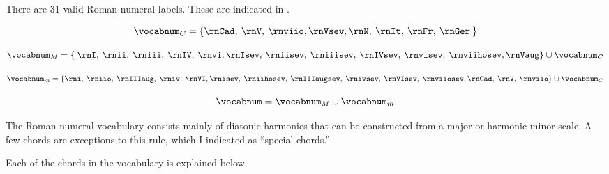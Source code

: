 
There are 31 valid Roman numeral labels. These are indicated
in .



\begin{equation}
    \vocabnum_{C} = \{ \rnCad, \: \rnV, \: \rnviio,
                \rnVsev, \rnN, \: \rnIt, \: \rnFr, \: \rnGer \: \}
\end{equation}

\begin{equation}
    \vocabnum_{M} = \{ \: \rnI, \: \rnii, \: \rniii, \: \rnIV, \: \rnvi,
                \rnIsev, \: \rniisev, \: \rniiisev, \: \rnIVsev, \: 
                \rnvisev, \: \rnviihosev, \rnVaug \} \cup \vocabnum_{C}
\end{equation}


\begin{equation}
    \vocabnum_{m} = \{ \rni, \: \rniio, \: \rnIIIaug, \: \rniv, \: \rnVI,
                \rnisev, \: \rniihosev, \: \rnIIIaugsev, \: \rnivsev, \: \rnVIsev, \: \rnviiosev,
                \rnCad, \: \rnV, \: \rnviio \} \cup \vocabnum_{C}
\end{equation}

\begin{equation}
    \vocabnum = \vocabnum_{M} \cup \vocabnum_{m}
\end{equation}

                

The Roman numeral vocabulary consists mainly of diatonic
harmonies that can be constructed from a major or harmonic
minor scale. A few chords are exceptions to this rule, \:
which I indicated as ``special chords.''

Each of the chords in the vocabulary is explained below.


